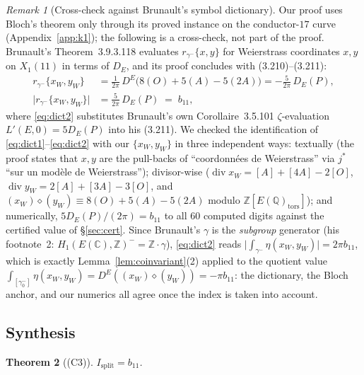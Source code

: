 \documentclass[11pt]{amsart}
\newtheorem{theorem}{Theorem}[section]
\theoremstyle{definition}
\theoremstyle{remark}
\newtheorem{remark}[theorem]{Remark}
\newcommand{\Q}{\mathbb{Q}}
\newcommand{\Z}{\mathbb{Z}}
\newcommand{\C}{\mathbb{C}}
\DeclareMathOperator{\divisor}{div}
\begin{document}
\begin{remark}[Cross-check against Brunault's symbol dictionary]
\label{rem:brunault-dict}
Our proof uses Bloch's theorem only through its proved instance on the
conductor-$17$ curve (Appendix~\ref{app:k1}); the following is a
cross-check, not part of the proof.
Brunault's Theorem~3.9.3.118 \cite{Brunault} evaluates
$r_{\gamma^-}\{x,y\}$ for Weierstrass coordinates $x,y$ on $X_1(11)$ in
terms of $D_E$, and its proof concludes with (3.210)--(3.211):
\begin{align}
  r_{\gamma^-}\{x_W,y_W\}
  &=\frac{1}{2\pi}\,D^E\bigl(8(O)+5(A)-5(2A)\bigr)
  =-\frac{5}{2\pi}\,D_E(P),\label{eq:dict1}\\
  \bigl|r_{\gamma^-}\{x_W,y_W\}\bigr|
  &=\frac{5}{2\pi}\,D_E(P)\;=\;b_{11},\label{eq:dict2}
\end{align}
where \eqref{eq:dict2} substitutes Brunault's own Corollaire~3.5.101
$\zeta$-evaluation $L'(E,0)=5D_E(P)$ \cite[(3.151)]{Brunault} into his
(3.211). We checked the identification of
\eqref{eq:dict1}--\eqref{eq:dict2} with our $\{x_W,y_W\}$ in three
independent ways: textually (the proof states that $x,y$ are the pull-backs
of ``coordonn\'ees de Weierstrass'' via $j^*$ ``sur un mod\`ele de
Weierstrass''); divisor-wise ($\divisor x_W=[A]+[4A]-2[O]$,
$\divisor y_W=2[A]+[3A]-3[O]$, and
$(x_W)\diamond(y_W)\equiv 8(O)+5(A)-5(2A)$ modulo $\Z[E(\Q)_{\mathrm{tors}}]$); and
numerically, $5D_E(P)/(2\pi)=b_{11}$ to all $60$ computed digits against
the certified value of \S\ref{sec:cert}. Since Brunault's $\gamma$ is the \emph{subgroup} generator
(his footnote~2: $H_1(E(\C),\Z)^-=\Z\cdot\gamma$), \eqref{eq:dict2}
reads $\bigl|\int_{\gamma^-}\eta(x_W,y_W)\bigr|=2\pi b_{11}$, which is
exactly Lemma~\ref{lem:coinvariant}(2) applied to the quotient value
$\int_{[\gamma^-_0]}\eta(x_W,y_W)=D^E((x_W)\diamond(y_W))=-\pi b_{11}$: the
dictionary, the Bloch anchor, and our numerics all agree once the index is
taken into account.
\end{remark}

\subsection{Synthesis}

\begin{theorem}[(C3)]\label{thm:C3}
$I_{\mathrm{split}}=b_{11}$.
\end{theorem}
\end{document}
